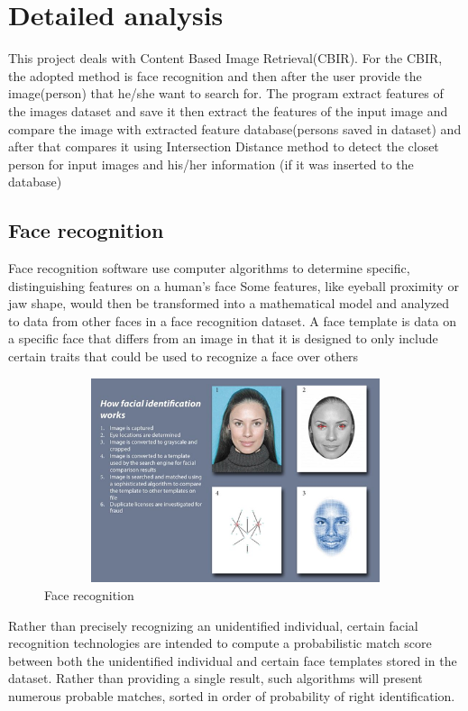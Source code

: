 \documentclass[pdftex,10pt,a4paper,oneside]{article}
\begin{document}
	
	\pagebreak
	\section{Detailed analysis}
	This project deals with Content Based Image Retrieval(CBIR). For the CBIR, the adopted method is face recognition and then after the user provide the image(person) that he/she want to search for. The program extract features of the images dataset and save it then extract the features of the input image and compare the image with extracted feature database(persons saved in dataset) and after that compares it using Intersection Distance method to detect the closet person for input images and his/her information (if it was inserted to the database)
	
	\subsection{Face recognition}
	Face recognition software use computer algorithms to determine specific, distinguishing features on a human's face Some features, like eyeball proximity or jaw shape, would then be transformed into a mathematical model and analyzed to data from other faces in a face recognition dataset. A face template is data on a specific face that differs from an image in that it is designed to only include certain traits that could be used to recognize a face over others 
\begin{figure}[H]
	\centering
	\includegraphics[width=120mm,height=60mm]{fig/30.png}
	\caption{Face recognition  }
	\label{Face recognition }
\end{figure}
Rather than precisely recognizing an unidentified individual, certain facial recognition technologies are intended to compute a probabilistic match score between both the unidentified individual and certain face templates stored in the dataset. Rather than providing a single result, such algorithms will present numerous probable matches, sorted in order of probability of right identification.\\
\end{document}
